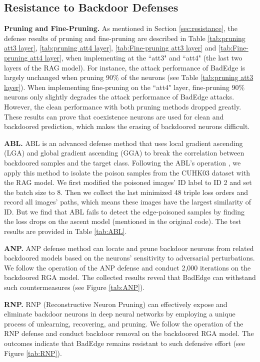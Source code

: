 \documentclass[sigconf,authordraft]{acmart}
\begin{document}
\subsection{Resistance to Backdoor Defenses}\label{sec:A3}
\noindent\textbf{Pruning and Fine-Pruning.}
As mentioned in Section \ref{sec:resistance}, the defense results of pruning and fine-pruning are described in Table \ref{tab:pruning att3 layer}, \ref{tab:pruning att4 layer}, \ref{tab:Fine-pruning att3 layer} and \ref{tab:Fine-pruning att4 layer}, when implementing at the ``att3" and ``att4" (the last two layers of the RAG model). For instance, the attack performance of BadEdge is largely unchanged when pruning 90$\%$ of the neurons (see Table \ref{tab:pruning att3 layer}). When implementing fine-pruning on the ``att4" layer, fine-pruning 90$\%$ neurons only slightly degrades the attack performance of BadEdge attacks. However, the clean performance with both pruning methods dropped greatly. These results can prove that coexistence neurons are used for clean and backdoored prediction, which makes the erasing of backdoored neurons difficult.

\noindent\textbf{ABL.}
ABL is an advanced defense method that uses local gradient ascending (LGA) and global gradient ascending (GGA) to break the correlation between backdoored samples and the target class. Following the ABL's operation \cite{li2021anti}, we apply this method to isolate the poison samples from the CUHK03 dataset with the RAG model. We first modified the poisoned images' ID label to ID 2 and set the batch size to 8. Then we collect the last minimized 48 triple loss orders and record all images' paths, which means these images have the largest similarity of ID. But we find that ABL fails to detect the edge-poisoned samples by finding the loss drops on the ascent model (mentioned in the original code). The test results are provided in Table \ref{tab:ABL}.

\noindent\textbf{ANP.}
ANP defense method can locate and prune backdoor neurons from related backdoored models based on the neurons' sensitivity to adversarial perturbations. We follow the operation of the ANP defense \cite{wu2021adversarial} and conduct 2,000 iterations on the backdoored RGA model. The collected results reveal that BadEdge can withstand such countermeasures (see Figure \ref{tab:ANP}).

\noindent\textbf{RNP.}
RNP (Reconstructive Neuron Pruning) can effectively expose and eliminate backdoor neurons in deep neural networks by employing a unique process of unlearning, recovering, and pruning. We follow the operation of the RNP defense \cite{wu2021adversarial} and conduct backdoor removal on the backdoored RGA model. The outcomes indicate that BadEdge remains resistant to such defensive effort (see Figure \ref{tab:RNP}).




\end{document}
